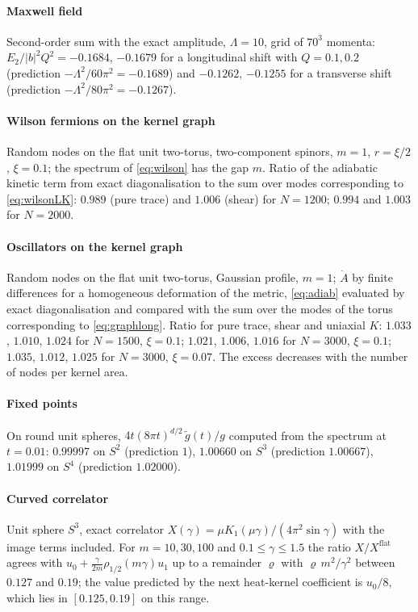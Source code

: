 \documentclass[11pt,a4paper]{article}
\theoremstyle{stmt}
\theoremstyle{defn}
\theoremstyle{rmk}
\numberwithin{equation}{section}
\begin{document}
\paragraph{Maxwell field} Second-order sum with the exact amplitude, $\Lambda=10$, grid of $70^3$ momenta: $E_2/|b|^2Q^2=-0.1684$, $-0.1679$ for a longitudinal shift with $Q=0.1,0.2$ (prediction $-\Lambda^2/60\pi^2=-0.1689$) and $-0.1262$, $-0.1255$ for a transverse shift (prediction $-\Lambda^2/80\pi^2=-0.1267$).

\paragraph{Wilson fermions on the kernel graph} Random nodes on the flat unit two-torus, two-component spinors, $m=1$, $r=\xi/2$, $\xi=0.1$; the spectrum of \eqref{eq:wilson} has the gap $m$. Ratio of the adiabatic kinetic term from exact diagonalisation to the sum over modes corresponding to \eqref{eq:wilsonLK}: $0.989$ (pure trace) and $1.006$ (shear) for $N=1200$; $0.994$ and $1.003$ for $N=2000$.

\paragraph{Oscillators on the kernel graph} Random nodes on the flat unit two-torus, Gaussian profile, $m=1$; $\dot A$ by finite differences for a homogeneous deformation of the metric, \eqref{eq:adiab} evaluated by exact diagonalisation and compared with the sum over the modes of the torus corresponding to \eqref{eq:graphlong}. Ratio for pure trace, shear and uniaxial $K$: $1.033$, $1.010$, $1.024$ for $N=1500$, $\xi=0.1$; $1.021$, $1.006$, $1.016$ for $N=3000$, $\xi=0.1$; $1.035$, $1.012$, $1.025$ for $N=3000$, $\xi=0.07$. The excess decreases with the number of nodes per kernel area.

\paragraph{Fixed points} On round unit spheres, $4t(8\pi t)^{d/2}\,\tilde g(t)/g$ computed from the spectrum at $t=0.01$: $0.99997$ on $S^2$ (prediction $1$), $1.00660$ on $S^3$ (prediction $1.00667$), $1.01999$ on $S^4$ (prediction $1.02000$).

\paragraph{Curved correlator} Unit sphere $S^3$, exact correlator $X(\gamma)=\mu K_1(\mu\gamma)/(4\pi^2\sin\gamma)$ with the image terms included. For $m=10,30,100$ and $0.1\le\gamma\le1.5$ the ratio $X/X^{\mathrm{flat}}$ agrees with $u_0+\tfrac{\gamma}{2m}\rho_{1/2}(m\gamma)u_1$ up to a remainder $\varrho$ with $\varrho\,m^2/\gamma^2$ between $0.127$ and $0.19$; the value predicted by the next heat-kernel coefficient is $u_0/8$, which lies in $[0.125,0.19]$ on this range.
\end{document}
